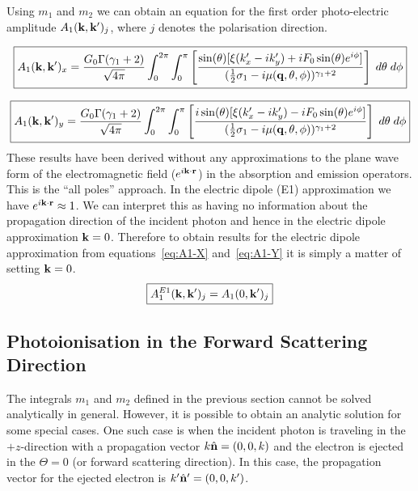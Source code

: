     Using $m_1$ and $m_2$ we can obtain an equation for the first order
    photo-electric amplitude $A_1(\mathbf{k},\mathbf{k'})_j$, where $j$ denotes 
    the polarisation direction.


    \begin{equation} \label{eq:A1-X}
    \boxed{
    A_1(\mathbf{k},\mathbf{k'})_x =
    \frac{G_0 \Gamma(\gamma_1 + 2)}{\sqrt{4\pi}}
    \int_{0}^{2\pi}
    \int_{0}^{\pi}
        \left[
            \frac {
            \sin(\theta) [ \xi(k'_x - ik'_y) + i F_0 \sin(\theta) e^{i\phi} ]
            } {
                (\frac{1}{2}\sigma_1 - i \mu(\mathbf{q},\theta,\phi) )^{\gamma_1 + 2}
            }
       \right]
    \; d\theta
    \; d\phi
    }
    \end{equation}


    \begin{equation} \label{eq:A1-Y}
    \boxed{
    A_1(\mathbf{k},\mathbf{k'})_y =
    \frac{G_0 \Gamma(\gamma_1 + 2)}{\sqrt{4\pi}}
    \int_{0}^{2\pi}
    \int_{0}^{\pi}
        \left[
            \frac
            {
            i \sin(\theta) [ \xi(k'_x - ik'_y) - i F_0 \sin(\theta) e^{i\phi} ]
            } {
                (\frac{1}{2}\sigma_1 - i \mu(\mathbf{q},\theta,\phi) )^{\gamma_1 + 2}
            }
        \right]
    \; d\theta
    \; d\phi 
    }
    \end{equation}
    These results have been derived without any approximations to the plane wave
    form of the electromagnetic field ($e^{i \mathbf{k} \cdot \mathbf{r} }$) in the absorption and
    emission operators. This is the ``all poles'' approach. 
    In the electric dipole (E1) approximation we have $e^{i \mathbf{k} \cdot \mathbf{r} } \approx 1$.
    We can interpret this as having no information about the propagation
    direction of the incident photon and hence in the electric dipole
    approximation $\mathbf{k} = 0$.
    Therefore to obtain results for the electric dipole approximation from
    equations~\ref{eq:A1-X} and~\ref{eq:A1-Y} it is simply a matter of
    setting $\mathbf{k} = 0$.
    \begin{equation} \label{eq:A1-Dipole}
    \boxed{
        A_1^{E1}(\mathbf{k},\mathbf{k'})_j = A_1(0,\mathbf{k'})_j
    }
    \end{equation}

\subsection{Photoionisation in the Forward Scattering Direction}
The integrals $m_1$ and $m_2$ defined in the previous section cannot be solved
analytically in general. However, it is possible to obtain an analytic solution 
for some special cases. One such case is when the incident photon is traveling
in the $+z$-direction with a propagation vector $k\hat{\mathbf{n}} = (0,0,k)$ and 
the electron is ejected in the $\Theta = 0$ (or forward scattering direction).
In this case, the propagation vector for the ejected electron is
$k'\hat{\mathbf{n}}' = (0,0,k')$.

